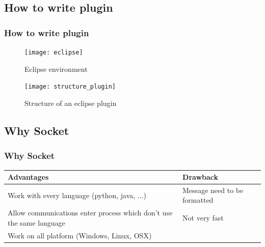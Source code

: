 \documentclass[10pt, svgnames, compress, red]{beamer}
\begin{document}
\subsection{How to write plugin}
\begin{frame}
  \frametitle{How to write plugin}
  \begin{figure}[h]
    \begin{minipage}[h]{0.45\linewidth}
      \texttt{[image: eclipse]}
      \caption{Eclipse environment}
    \end{minipage}\hfill
    \begin{minipage}[h]{0.45\linewidth}
      \texttt{[image: structure\_plugin]}
      \caption{Structure of an eclipse plugin}
    \end{minipage}
  \end{figure}
  \transdissolve[duration=0.1]
\end{frame}

\subsection{Why Socket}
\begin{frame}
  \frametitle{Why Socket}
  \begin{tabular}{|p{}||p{}|}
    \hline
    \textbf{Advantages}&\textbf{Drawback}\\
    \hline
    Work with every language (python, java, ...) & Message need to be formatted\\
    \hline
    Allow communications enter process which don't use the same language& Not very fast\\
    \hline
    Work on all platform (Windows, Linux, OSX)&\\
    \hline
  \end{tabular}

  \transdissolve[duration=0.1]
\end{frame}
\end{document}
